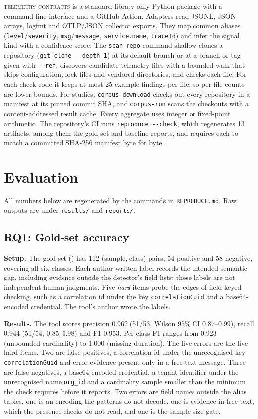 \documentclass[conference]{IEEEtran}
\newcommand{\tool}{\textsc{telemetry-contracts}\xspace}
\begin{document}
\tool is a standard-library-only Python package with a command-line interface and a GitHub Action. Adapters read JSONL, JSON arrays, logfmt and OTLP/JSON collector exports. They map common aliases (\texttt{level}/\texttt{severity}, \texttt{msg}/\texttt{message}, \texttt{service.name}, \texttt{traceId}) and infer the signal kind with a confidence score. The \texttt{scan-repo} command shallow-clones a repository (\texttt{git clone -{}-depth 1}) at its default branch or at a branch or tag given with \texttt{-{}-ref}, discovers candidate telemetry files with a bounded walk that skips configuration, lock files and vendored directories, and checks each file. For each check code it keeps at most 25 example findings per file, so per-file counts are lower bounds. For studies, \texttt{corpus-download} checks out every repository in a manifest at its pinned commit SHA, and \texttt{corpus-run} scans the checkouts with a content-addressed result cache. Every aggregate uses integer or fixed-point arithmetic. The repository's CI runs \texttt{reproduce -{}-check}, which regenerates 13 artifacts, among them the gold-set and baseline reports, and requires each to match a committed SHA-256 manifest byte for byte.

\section{Evaluation}

All numbers below are regenerated by the commands in \texttt{REPRODUCE.md}. Raw outputs are under \texttt{results/} and \texttt{reports/}.

\subsection{RQ1: Gold-set accuracy}

\textbf{Setup.} The gold set () has 112 (sample, class) pairs, 54 positive and 58 negative, covering all six classes. Each author-written label records the intended semantic gap, including evidence outside the detector's field lists; these labels are not independent human judgments. Five \emph{hard} items probe the edges of field-keyed checking, such as a correlation id under the key \texttt{correlationGuid} and a base64-encoded credential. The tool's author wrote the labels.

\textbf{Results.} The tool scores precision 0.962 (51/53, Wilson 95\% CI 0.87--0.99), recall 0.944 (51/54, 0.85--0.98) and F1 0.953. Per-class F1 ranges from 0.923 (unbounded-cardinality) to 1.000 (missing-duration). The five errors are the five hard items. Two are false positives, a correlation id under the unrecognised key \texttt{correlationGuid} and error evidence present only in a free-text message. Three are false negatives, a base64-encoded credential, a tenant identifier under the unrecognised name \texttt{org\_id} and a cardinality sample smaller than the minimum the check requires before it reports. Two errors are field names outside the alias tables, one is an encoding the patterns do not decode, one is evidence in free text, which the presence checks do not read, and one is the sample-size gate.
\end{document}

